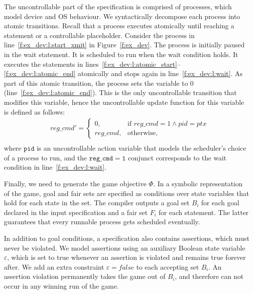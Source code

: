 The uncontrollable part of the specification is comprised of \tsl processes, which model device and OS behaviour.  We syntactically decompose each process into atomic transitions.  Recall that a process executes atomically until reaching a  statement or a controllable placeholder.  Consider the  process in line~\ref{f:ex_dev:l:start_xmit} in Figure~\ref{f:ex_dev}.  The process is initially paused in the wait statement.  It is scheduled to run when the wait condition holds.  It executes the statements in lines~\ref{f:ex_dev:l:atomic_start}--\ref{f:ex_dev:l:atomic_end} atomically and stops again in line~\ref{f:ex_dev:l:wait}.  As part of this atomic transition, the process sets the  variable to 0 (line~\ref{f:ex_dev:l:atomic_end}).  This is the only uncontrollable transition that modifies this variable, hence the uncontrollable update function for this variable is defined as follows:
$$
\begin{aligned}
    &reg\_cmd' = \begin{cases}
                    0       , & \text{if } reg\_cmd=1 \land pid=ptx\\
                    reg\_cmd, & \text{otherwise},
                 \end{cases}\\
\end{aligned}
$$
where $\mathtt{pid}$ is an uncontrollable action variable that models the scheduler's choice of a process to run, and the $\mathtt{reg\_cmd=1}$ conjunct corresponds to the wait condition in line~\ref{f:ex_dev:l:wait}.
  
Finally, we need to generate the game objective $\Phi$.  In a symbolic representation of the game, goal and fair sets are specified as conditions over state variables that hold for each state in the set.  The \tsl compiler outputs a goal set $B_i$ for each goal declared in the input specification and a fair set $F_i$ for each  statement.  The latter guarantees that every runnable process gets scheduled eventually.
        
In addition to goal conditions, a \tsl specification also contains assertions, which must never be violated.  We model assertions using an auxiliary Boolean state variable $\varepsilon$, which is set to true whenever an assertion is violated and remains true forever after.  We add an extra constraint $\varepsilon=false$ to each accepting set $B_i$.  An assertion violation permanently takes the game out of $B_i$, and therefore can not occur in any winning run of the game.

